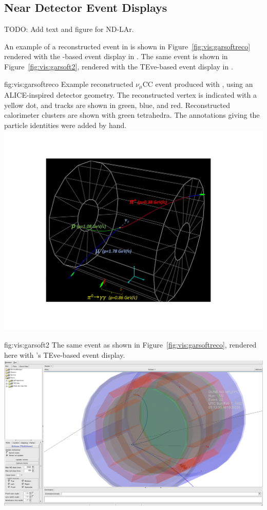 \documentclass[../main-v1.tex]{subfiles}
\begin{document}
\subsection{Near Detector Event Displays}
\label{sec:visualization:neardetector}

TODO:  {\color{red}Add text and figure for ND-LAr.}

An example of a reconstructed event in  is shown in Figure~\ref{fig:vis:garsoftreco} rendered with the -based event display in .  The same event is shown in Figure~\ref{fig:vis:garsoft2}, rendered with the TEve-based event display in .

\begin{dunefigure}
{fig:vis:garsoftreco} 
{Example reconstructed $\nu_\mu$CC event produced with , using an ALICE-inspired detector geometry.  The reconstructed vertex is indicated with a yellow dot, and tracks are shown in green, blue, and red.  Reconstructed calorimeter clusters are shown with green tetrahedra.  The annotations giving the  particle identities were added by hand.}
\includegraphics[width=0.9 \textwidth]{graphics/EventDisplays/nd_gar_evdwp2_withcaloclusters.pdf}
\end{dunefigure}

\begin{dunefigure}
{fig:vis:garsoft2} 
{The same  event as shown in Figure~\ref{fig:vis:garsoftreco}, rendered here with  's TEve-based event display.}
\includegraphics[width=0.9 \textwidth]{graphics/EventDisplays/ndgar_evd3d.png}
\end{dunefigure}
\end{document}
